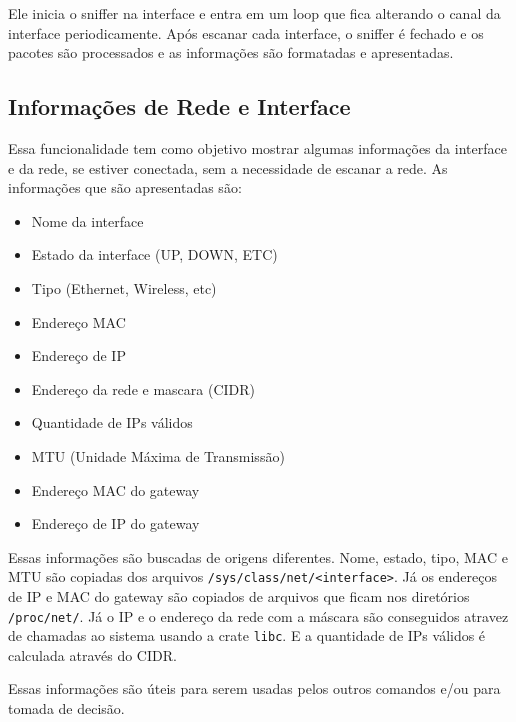 Ele inicia o sniffer na interface e entra em um loop que fica alterando o canal da interface periodicamente. Após escanar cada interface, o sniffer é fechado e os pacotes são processados e as informações são formatadas e apresentadas.



\subsection{\textbf{Informações de Rede e Interface}}
Essa funcionalidade tem como objetivo mostrar algumas informações da interface e da rede, se estiver conectada, sem a necessidade de escanar a rede. As informações que são apresentadas são:

\begin{itemize}
    \item Nome da interface
    \item Estado da interface (UP, DOWN, ETC)
    \item Tipo (Ethernet, Wireless, etc)
    \item Endereço MAC
    \item Endereço de IP
    \item Endereço da rede e mascara (CIDR)
    \item Quantidade de IPs válidos
    \item MTU (Unidade Máxima de Transmissão)
    \item Endereço MAC do gateway
    \item Endereço de IP do gateway
\end{itemize}

Essas informações são buscadas de origens diferentes. Nome, estado, tipo, MAC e MTU são copiadas dos arquivos \texttt{/sys/class/net/<interface>}. Já os endereços de IP e MAC do gateway são copiados de arquivos que ficam nos diretórios \texttt{/proc/net/}. Já o IP e o endereço da rede com a máscara são conseguidos atravez de chamadas ao sistema usando a crate \texttt{libc}. E a quantidade de IPs válidos é calculada através do CIDR.

Essas informações são úteis para serem usadas pelos outros comandos e/ou para tomada de decisão.